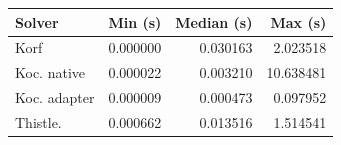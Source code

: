 \begin{tabular}{p{}rrr}
\hline
Solver & Min (s) & Median (s) & Max (s) \\
\hline
Korf & 0.000000 & 0.030163 & 2.023518 \\
Koc. native & 0.000022 & 0.003210 & 10.638481 \\
Koc. adapter & 0.000009 & 0.000473 & 0.097952 \\
Thistle. & 0.000662 & 0.013516 & 1.514541 \\
\hline
\end{tabular}

